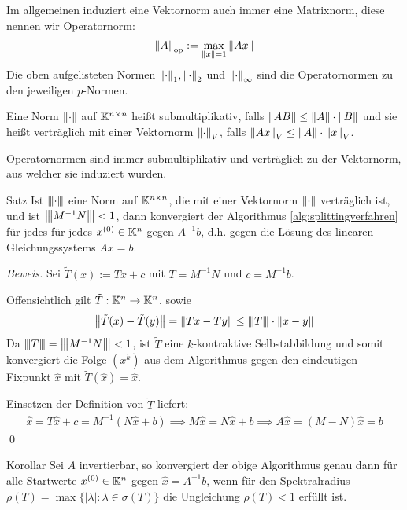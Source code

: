 Im allgemeinen induziert eine Vektornorm auch immer eine Matrixnorm, diese nennen wir Operatornorm:
%
\begin{align*}
  \vertn{2}{A}_{\op}:=\max_{\vertn{2}{x}=1}\vertn{2}{Ax}
\end{align*}
%
Die oben aufgelisteten Normen $\vertn{2}{\cdot}_1,\vertn{2}{\cdot}_2$ und $\vertn{2}{\cdot}_\infty$ sind die 
Operatornormen zu den jeweiligen $p$-Normen.

Eine Norm $\vertn{2}{\cdot}$ auf $\mathbb K^{n\times n}$ heißt submultiplikativ, falls 
$\vertn{2}{AB}\leq\vertn{2}{A}\cdot\vertn{2}{B}$ 
und sie heißt verträglich mit einer Vektornorm $\vertn{2}{\cdot}_V$, falls 
$\vertn{2}{Ax}_V\leq \vertn{2}{A}\cdot\vertn{2}{x}_V$. 

Operatornormen sind immer submultiplikativ und verträglich zu der Vektornorm, aus welcher sie induziert wurden.

\begin{colbox}{Satz}\label{satz:konvergenzAlg1Norm}
  Ist $\vertn{3}{\cdot}$ eine Norm auf $\mathbb K^{n\times n}$, die mit einer Vektornorm $\vertn{2}{\cdot}$ verträglich ist, 
  und ist $\vertn{3}{M^{-1}N}<1$, dann konvergiert der Algorithmus \ref{alg:splittingverfahren} 
  für jedes für jedes $x^{(0)}\in\mathbb K^n$ gegen $A^{-1}b$, d.h. gegen die Lösung des linearen Gleichungssystems $Ax=b$.
\end{colbox}

\textit{Beweis.} 
Sei $\tilde{T}(x) := Tx + c$ mit $T=M^{-1}N$ und $c=M^{-1}b$.

Offensichtlich gilt $\tilde{T}:\mathbb K^n\rightarrow\mathbb K^n$, sowie 
%
\begin{align*}
  \vertn{2}{\tilde{T}(x)-\tilde{T}(y)} 
  = \vertn{2}{Tx-Ty}
  \leq \vertn{3}{T}\cdot\vertn{2}{x-y}
\end{align*}
%
Da $\vertn{3}{T}=\vertn{3}{M^{-1}N}<1$, ist $\tilde{T}$ eine $k$-kontraktive Selbstabbildung und somit konvergiert 
die Folge $(x^k)$ aus dem Algorithmus gegen den eindeutigen Fixpunkt $\hat{x}$ mit $\tilde{T}(\hat{x})=\hat{x}$. 

Einsetzen der Definition von $\tilde{T}$ liefert:
%
\begin{align*}
  \hat{x}=T\hat{x}+c=M^{-1}(N\hat{x}+b)
  \implies M\hat{x}=N\hat{x}+b 
  \implies A\hat{x}=(M-N)\hat{x}=b
\end{align*}
%
\qed

\begin{colbox}{Korollar}\label{cor:konvergenzAlg1Spektralradius}
  Sei $A$ invertierbar, so konvergiert der obige Algorithmus genau dann für alle Startwerte $x^{(0)}\in\mathbb K^n$ 
  gegen $\hat{x}=A^{-1}b$, wenn für den Spektralradius $\rho(T)=\max\{|\lambda|:\lambda\in\sigma(T)\}$ 
  die Ungleichung $\rho(T)<1$ erfüllt ist.
\end{colbox}

